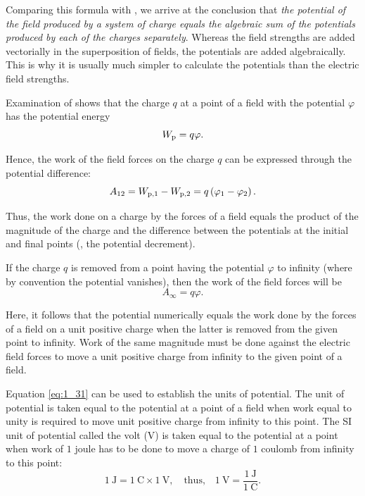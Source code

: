 Comparing this formula with , we arrive at the conclusion that \textit{the potential of the field produced by a system of charge equals the algebraic sum of the potentials produced by each of the charges separately}. Whereas the field strengths are added vectorially in the superposition of fields, the potentials are added algebraically. This is why it is usually much simpler to calculate the potentials than the electric field strengths.

Examination of  shows that the charge $q$ at a point of a field with the potential $\varphi$ has the potential energy
\begin{equation}\label{eq:1_29}
	W_{\text{p}} = q\varphi.
\end{equation}

\noindent
Hence, the work of the field forces on the charge $q$ can be expressed through the potential difference:
\begin{equation}\label{eq:1_30}
	A_{12} = W_{\text{p,$1$}} - W_{\text{p,$2$}} = q \left(\varphi_1 - \varphi_2\right).
\end{equation}

\noindent
Thus, the work done on a charge by the forces of a field equals the product of the magnitude of the charge and the difference between the potentials at the initial and final points (\ie, the potential decrement).

If the charge $q$ is removed from a point having the potential $\varphi$ to infinity (where by convention the potential vanishes), then the work of the field forces will be
\begin{equation}\label{eq:1_31}
	A_{\infty} = q \varphi.
\end{equation}

\noindent
Here, it follows that the potential numerically equals the work done by the forces of a field on a unit positive charge when the latter is removed from the given point to infinity. Work of the same magnitude must be done against the electric field forces to move a unit positive charge from infinity to the given point of a field.

Equation \eqref{eq:1_31} can be used to establish the units of potential. The unit of potential is taken equal to the potential at a point of a field when work equal to unity is required to move unit positive charge from infinity to this point. The SI unit of potential called the volt (\si{\volt}) is taken equal to the potential at a point when work of $1$ joule has to be done to move a charge of $1$ coulomb from infinity to this point:
\begin{equation}\label{eq:1_32}
	\SI{1}{\joule} = \SI{1}{\coulomb} \times \SI{1}{\volt},\quad  \text{thus,}\quad \SI{1}{\volt} = \frac{\SI{1}{\joule}}{\SI{1}{\coulomb}}.
\end{equation}

